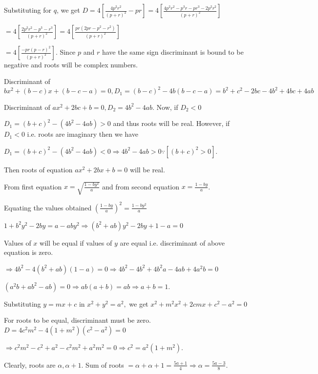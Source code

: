   Substituting for $q$, we get $D = 4\left[\frac{4p^2r^2}{(p + r)^2} - pr\right] = 4\left[\frac{4p^2r^2 -
      p^3r - pr^3 - 2p^2r^2}{(p + r)^2}\right]$

  $= 4\left[\frac{2p^2r^2 - p^3 - r^3}{(p + r)^2}\right] = 4\left[\frac{pr(2pr - p^2 - r^2)}{(p + r)^2}\right]$

  $= 4\left[\frac{-pr(p - r)^2}{(p + r)^2}\right]$. Since $p$ and $r$ have the same sign discriminant is
  bound to be negative and roots will be complex numbers.
\item Discriminant of $bx^2 + (b - c)x + (b - c - a) = 0, D_1 = (b - c)^2 -4b(b - c - a) = b^2 + c^2 -2bc -4b^2 + 4bc + 4ab$

  Discriminant of $ax^2 + 2bc + b = 0, D_2 = 4b^2 - 4ab$. Now, if $D_2 < 0$

  $D_1 = (b + c)^2 - (4b^2 - 4ab) > 0$ and thus roots will be real. However, if $D_1 < 0$ i.e. roots are imaginary then we have

  $D_1 = (b + c)^2 - (4b^2 - 4ab) < 0 \Rightarrow 4b^2 - 4ab > 0 \because [(b + c)^2 > 0]$.

  Then roots of equation $ax^2 + 2bx + b = 0$ will be real.
\item From first equation $x = \sqrt{\frac{1 - by^2}{a}}$ and from second equation $x = \frac{1 - by}{a}$.

  Equating the values obtained $\left(\frac{1 - by}{a}\right)^2 = \frac{1 - by^2}{a}$

  $1 + b^2y^2 - 2by = a - aby^2 \Rightarrow (b^2 + ab)y^2 - 2by + 1 - a = 0$

  Values of $x$ will be equal if values of $y$ are equal i.e. discriminant of above equation is zero.

  $\Rightarrow 4b^2 - 4(b^2 + ab)(1 - a) = 0 \Rightarrow  4b^2 - 4b^2 + 4b^2a - 4ab + 4a^2b = 0$

  $(a^2b + ab^2 - ab) = 0\Rightarrow ab(a + b) = ab\Rightarrow a + b = 1$.
\item Substituting $y = mx + c$ in $x^2 + y^2 = a^2,$ we get $x^2 + m^2x^2 + 2cmx + c^2 - a^2 = 0$

  For roots to be equal, discriminant must be zero. $D = 4c^2m^2 - 4(1 + m^2)(c^2 - a^2) = 0$

  $\Rightarrow c^2m^2 - c^2 + a^2 - c^2m^2 + a^2m^2 = 0\Rightarrow c^2 = a^2(1 + m^2)$.
\item Clearly, roots are $\alpha, \alpha + 1$. Sum of roots $= \alpha + \alpha + 1 = \frac{5a +
  1}{4}\Rightarrow \alpha = \frac{5a - 3}{8}$.

